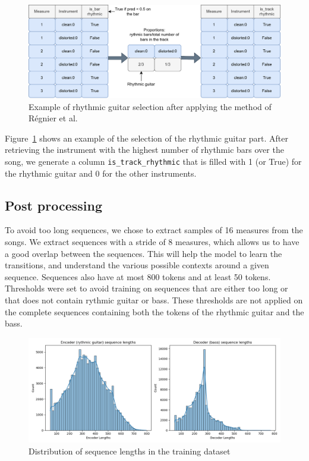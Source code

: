 \begin{figure}[!ht]
    \centering
    \includegraphics[width=\linewidth]{../images-figures/rhythm_guitar_selection.png}
    \caption{Example of rhythmic guitar selection after applying the method of Régnier et al.}
    \label{fig:rhythm_guitar_selection}
\end{figure}

Figure~\ref{fig:rhythm_guitar_selection} shows an example of the selection of the rhythmic guitar part.
After retrieving the instrument with the highest number of rhythmic bars over the song,
we generate a column \texttt{is\_track\_rhythmic} that is filled with 1 (or True) for the rhythmic guitar and 0 for the other instruments.


\subsection{Post processing}

To avoid too long sequences, we chose to extract samples of 16 measures from the songs.
We extract sequences with a stride of 8 measures, which allows us to have a good overlap between the sequences.
This will help the model to learn the transitions, and understand the various possible contexts around a given sequence.
Sequences also have at most 800 tokens and at least 50 tokens.
Thresholds were set to avoid training on sequences that are either too long or that does not contain rythmic guitar or bass.
These thresholds are not applied on the complete sequences containing both the tokens of the rhythmic guitar and the bass.

\begin{figure}[!ht]
    \centering
    \includegraphics[width=.8\linewidth]{../images-figures/sequence_lengths_16_8_800_50.png}
    \caption{Distribution of sequence lengths in the training dataset}
    \label{fig:sequence_length_distribution}
\end{figure}

